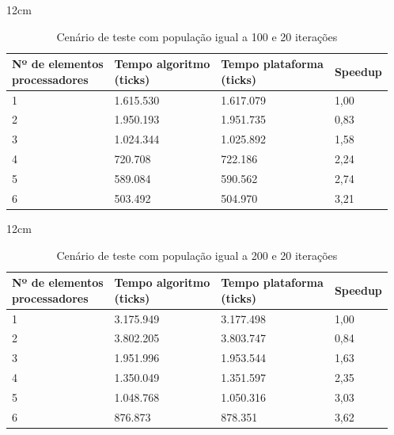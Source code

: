 \begin{table}[h]{12cm}
    \caption{Cenário de teste com população igual a 100 e 20 iterações}
    \label{tbl:taylor-vortex-parameters}
    \begin{tabular}{llll}
        \hline
        \shortstack[l]{Nº de elementos \\ processadores} & \shortstack[l]{Tempo algoritmo \\ (ticks)} & \shortstack[l]{Tempo plataforma \\ (ticks)} & Speedup \\
        \hline
        1 & 1.615.530 & 1.617.079 & 1,00 \\
        2 & 1.950.193 & 1.951.735 & 0,83 \\
        3 & 1.024.344 & 1.025.892 &	1,58 \\
        4 & 720.708   & 722.186   & 2,24 \\
        5 & 589.084   & 590.562   & 2,74 \\
        6 & 503.492   & 504.970   & 3,21 \\
        \hline
    \end{tabular}
\end{table}

\begin{table}[h]{12cm}
    \caption{Cenário de teste com população igual a 200 e 20 iterações}
    \label{tbl:taylor-vortex-parameters}
    \begin{tabular}{llll}
        \hline
        \shortstack[l]{Nº de elementos \\ processadores} & \shortstack[l]{Tempo algoritmo \\ (ticks)} & \shortstack[l]{Tempo plataforma \\ (ticks)} & Speedup \\
        \hline
        1 & 3.175.949 & 3.177.498 & 1,00 \\
        2 & 3.802.205 & 3.803.747 & 0,84 \\
        3 & 1.951.996 & 1.953.544 &	1,63 \\
        4 & 1.350.049 & 1.351.597 & 2,35 \\
        5 & 1.048.768 & 1.050.316 & 3,03 \\
        6 & 876.873   & 878.351   & 3,62 \\
        \hline
    \end{tabular}
\end{table}

